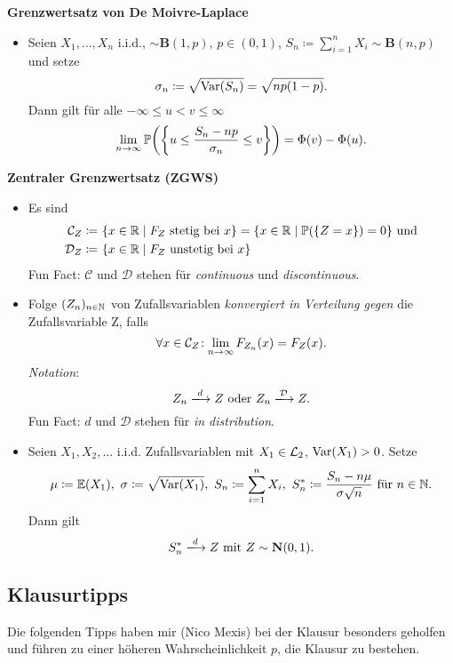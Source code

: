 \textbf{Grenzwertsatz von De Moivre-Laplace}
\begin{itemize}
	\item Seien $X_1,\ldots,X_n$ i.i.d., $\sim \textbf{B}(1,p)$, $p\in(0,1)$, $S_n\coloneqq\sum_{i=1}^n X_i\sim\textbf{B}(n,p)$ und setze
	\[
	  \sigma_n\coloneqq\sqrt{\operatorname{Var}(S_n)}=\sqrt{np(1-p)}.
	\]
	Dann gilt für alle $-\infty\leq u<v\leq\infty$
	\[
	  \limfty{n} \Pr\left(\left\{u\leq\frac{S_n-np}{\sigma_n}\leq v\right\}\right)=\Phi(v)-\Phi(u).
	\]
\end{itemize}

\textbf{Zentraler Grenzwertsatz (ZGWS)}
\begin{itemize}
	\item Es sind
	\begin{align*}
	  \mathcal{C}_Z\coloneqq\ &\{x\in\R\mid F_Z\ \text{stetig bei}\ x\}=\{x\in\R\mid \Pr(\{Z=x\})=0\}\ \text{und}\\
	  \mathcal{D}_Z\coloneqq\ &\{x\in\R\mid F_Z\ \text{unstetig bei}\ x\}
	\end{align*}
    Fun Fact: $\mathcal{C}$ und $\mathcal{D}$ stehen für \emph{continuous} und \emph{discontinuous}.
	
	\item Folge $(Z_n)_{n\in\mathbb{N}}$ von Zufallsvariablen \emph{konvergiert in Verteilung gegen} die Zufallsvariable Z, falls
	\[
	  \forall x\in\mathcal{C}_Z\!:\lim\limits_{n\to\infty} F_{Z_n}(x)=F_Z(x).
	\]
	\emph{Notation}:
	\[
	  Z_n\xlongrightarrow{d}Z\ \text{oder}\ Z_n\xlongrightarrow{\mathcal{D}}Z.
	\]
	Fun Fact: $d$ und $\mathcal{D}$ stehen für \emph{in distribution}.

	\item Seien $X_1,X_2,\ldots$ i.i.d. Zufallsvariablen mit $X_1\in\mathcal{L}_2$, $\operatorname{Var}(X_1)>0$. Setze
	\[
	  \mu\coloneqq\E(X_1),\ \sigma\coloneqq\sqrt{\Var(X_1)},\ S_n\coloneqq\sum_{i=1}^n X_i,\ S_n^*\coloneqq \frac{S_n-n\mu}{\sigma\sqrt{n}}\ \text{für}\ n\in\N.
	\]
	Dann gilt
	\[
	  S_n^*\xlongrightarrow{d} Z\ \text{mit}\ Z\sim\textbf{N}(0,1).
	\]
\end{itemize}

\newpage
\subsection{Klausurtipps}

Die folgenden Tipps haben mir (Nico Mexis) bei der Klausur besonders geholfen und führen zu einer höheren Wahrscheinlichkeit $p$, die Klausur zu bestehen.

